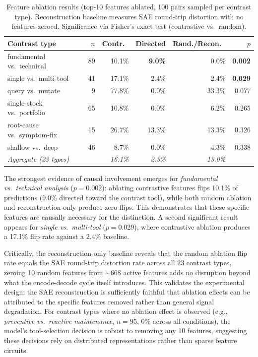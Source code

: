 \documentclass[runningheads]{llncs}
\begin{document}
\begin{table}[t]
\caption{Feature ablation results (top-10 features ablated, 100 pairs sampled per contrast type). Reconstruction baseline measures SAE round-trip distortion with no features zeroed. Significance via Fisher's exact test (contrastive vs.\ random).}
\label{tab:ablation}
\centering
\small
\begin{tabular}{lrrrrr}
\toprule
Contrast type & $n$ & Contr.\ & Directed & Rand./Recon.\ & $p$ \\
\midrule
fundamental vs.\ technical & 89 & 10.1\% & \textbf{9.0\%} & 0.0\% & \textbf{0.002} \\
single vs.\ multi-tool & 41 & 17.1\% & 2.4\% & 2.4\% & \textbf{0.029} \\
query vs.\ mutate & 9 & 77.8\% & 0.0\% & 33.3\% & 0.077 \\
single-stock vs.\ portfolio & 65 & 10.8\% & 0.0\% & 6.2\% & 0.265 \\
root-cause vs.\ symptom-fix & 15 & 26.7\% & 13.3\% & 13.3\% & 0.326 \\
shallow vs.\ deep & 46 & 8.7\% & 0.0\% & 4.3\% & 0.338 \\
\midrule
\textit{Aggregate (23 types)} & & \textit{16.1\%} & \textit{2.3\%} & \textit{13.0\%} & \\
\bottomrule
\end{tabular}
\end{table}

The strongest evidence of causal involvement emerges for \emph{fundamental vs.\ technical analysis} ($p = 0.002$): ablating contrastive features flips 10.1\% of predictions (9.0\% directed toward the contrast tool), while both random ablation and reconstruction-only produce zero flips. This demonstrates that these specific features are causally necessary for the distinction. A second significant result appears for \emph{single vs.\ multi-tool} ($p = 0.029$), where contrastive ablation produces a 17.1\% flip rate against a 2.4\% baseline.

Critically, the reconstruction-only baseline reveals that the random ablation flip rate equals the SAE round-trip distortion rate across all 23 contrast types, zeroing 10 random features from ${\sim}668$ active features adds no disruption beyond what the encode-decode cycle itself introduces. This validates the experimental design: the SAE reconstruction is sufficiently faithful that ablation effects can be attributed to the specific features removed rather than general signal degradation. For contrast types where no ablation effect is observed (e.g., \emph{preventive vs.\ reactive maintenance}, $n = 95$, 0\% across all conditions), the model's tool-selection decision is robust to removing any 10 features, suggesting these decisions rely on distributed representations rather than sparse feature circuits.
\end{document}
